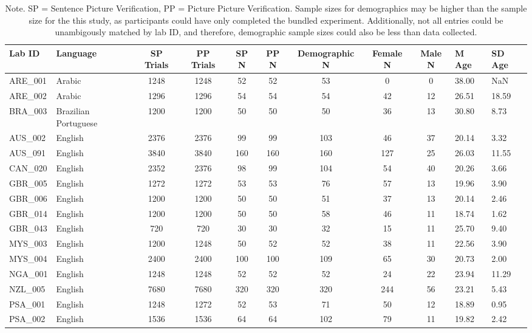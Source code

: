 \documentclass[
  man]{apa7}
\begin{document}
\begin{table}

\caption{\label{tab:sample-table}Note. SP = Sentence Picture Verification, PP = Picture Picture Verification. Sample sizes for demographics may be higher than the sample size for the this study, as participants could have only completed the bundled experiment. Additionally, not all entries could be unambigously matched by lab ID, and therefore, demographic sample sizes could also be less than data collected.}
\centering
\begin{tabular}[t]{llcccccccll}
\toprule
Lab ID & Language & SP Trials & PP Trials & SP N & PP N & Demographic N & Female N & Male N & M Age & SD Age\\
\midrule
ARE\_001 & Arabic & 1248 & 1248 & 52 & 52 & 53 & 0 & 0 & 38.00 & NaN\\
ARE\_002 & Arabic & 1296 & 1296 & 54 & 54 & 54 & 42 & 12 & 26.51 & 18.59\\
BRA\_003 & Brazilian Portuguese & 1200 & 1200 & 50 & 50 & 50 & 36 & 13 & 30.80 & 8.73\\
AUS\_002 & English & 2376 & 2376 & 99 & 99 & 103 & 46 & 37 & 20.14 & 3.32\\
AUS\_091 & English & 3840 & 3840 & 160 & 160 & 160 & 127 & 25 & 26.03 & 11.55\\
\addlinespace
CAN\_020 & English & 2352 & 2376 & 98 & 99 & 104 & 54 & 40 & 20.26 & 3.66\\
GBR\_005 & English & 1272 & 1272 & 53 & 53 & 76 & 57 & 13 & 19.96 & 3.90\\
GBR\_006 & English & 1200 & 1200 & 50 & 50 & 51 & 37 & 13 & 20.14 & 2.46\\
GBR\_014 & English & 1200 & 1200 & 50 & 50 & 58 & 46 & 11 & 18.74 & 1.62\\
GBR\_043 & English & 720 & 720 & 30 & 30 & 32 & 15 & 11 & 25.70 & 9.40\\
\addlinespace
MYS\_003 & English & 1200 & 1248 & 50 & 52 & 52 & 38 & 11 & 22.56 & 3.90\\
MYS\_004 & English & 2400 & 2400 & 100 & 100 & 109 & 65 & 30 & 20.73 & 2.00\\
NGA\_001 & English & 1248 & 1248 & 52 & 52 & 52 & 24 & 22 & 23.94 & 11.29\\
NZL\_005 & English & 7680 & 7680 & 320 & 320 & 320 & 244 & 56 & 23.21 & 5.43\\
PSA\_001 & English & 1248 & 1272 & 52 & 53 & 71 & 50 & 12 & 18.89 & 0.95\\
\addlinespace
PSA\_002 & English & 1536 & 1536 & 64 & 64 & 102 & 79 & 11 & 19.82 & 2.42\\

\end{tabular}
\end{table}
\end{document}
